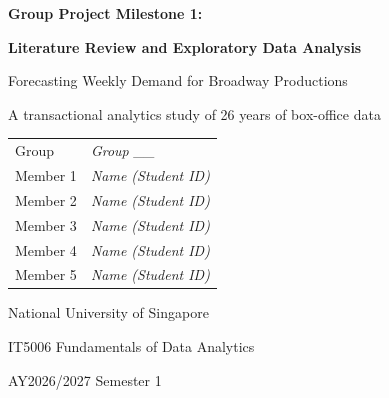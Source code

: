 \documentclass[11pt,a4paper]{article}
\begin{document}
\begin{titlepage}
\centering
\vspace*{3.5cm}

{\Large\bfseries Group Project Milestone 1:\par}
\vspace{0.6em}
{\Large\bfseries Literature Review and Exploratory Data Analysis\par}

\vspace{1.2cm}
{\large Forecasting Weekly Demand for Broadway Productions\par}
\vspace{0.4em}
{\normalsize A transactional analytics study of 26 years of box-office data\par}

\vspace{3.5cm}

{\normalsize
\begin{tabular}{ll}
Group & \textit{Group \_\_} \\[2pt]
Member 1 & \textit{Name (Student ID)} \\
Member 2 & \textit{Name (Student ID)} \\
Member 3 & \textit{Name (Student ID)} \\
Member 4 & \textit{Name (Student ID)} \\
Member 5 & \textit{Name (Student ID)} \\
\end{tabular}\par}

\vfill

{\large National University of Singapore\par}
\vspace{0.4em}
{\large IT5006 Fundamentals of Data Analytics\par}
\vspace{0.4em}
{\large AY2026/2027 Semester 1\par}

\vspace{1.2cm}
\end{titlepage}




\end{document}
